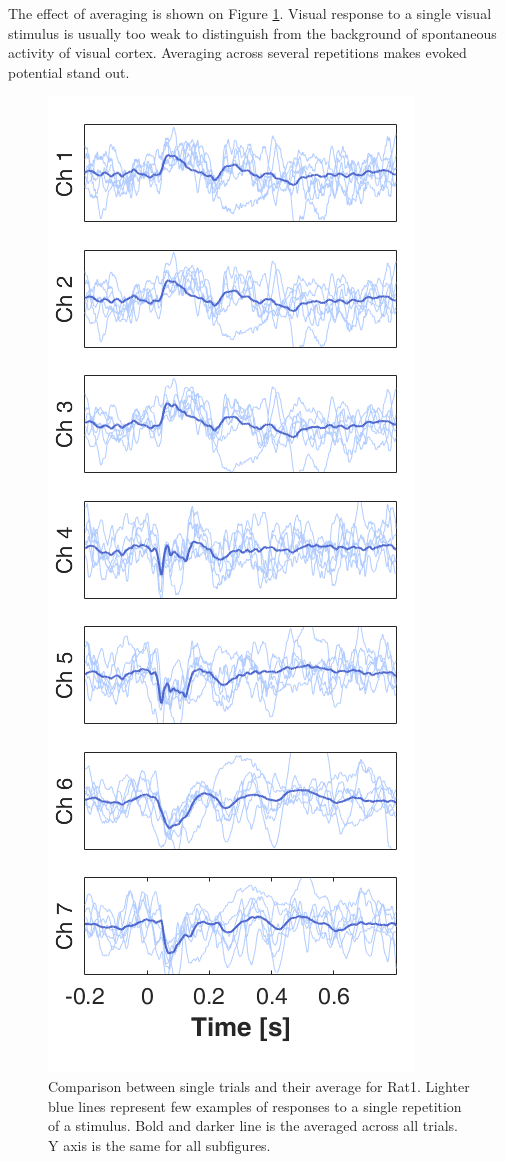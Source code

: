 \documentclass{pracalicmgr}
\begin{document}
    The effect of averaging is shown on Figure \ref{rys:usrednianie}. Visual response to a single visual stimulus is usually too weak to distinguish from the background of spontaneous activity of visual cortex. Averaging across several repetitions makes evoked potential stand out.
    \begin{figure}[H]
    	\begin{center}
    		\includegraphics[scale=0.5]{usrednianie3.png}
    	\end{center}
    	\caption{ Comparison between single trials and their average for Rat1. Lighter blue lines represent few examples of responses to a single repetition of a stimulus. Bold and darker line is the averaged across all trials. Y axis is the same for all subfigures. }
    	\label{rys:usrednianie}
    \end{figure} 
\end{document}
